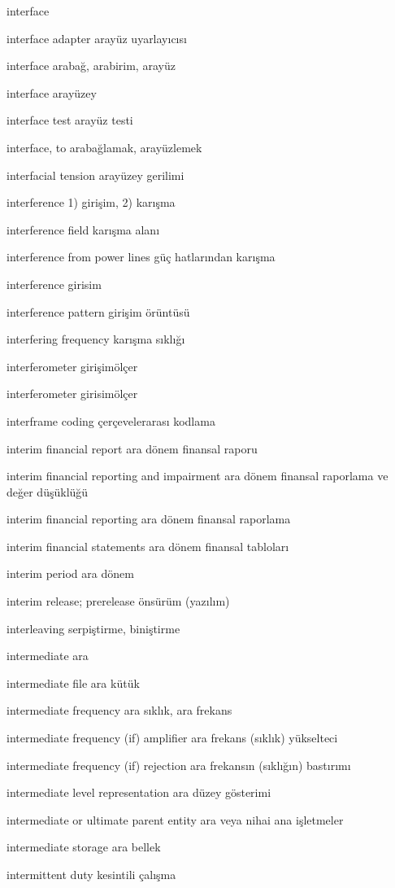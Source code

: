 \documentclass[12pt,fleqn]{article}\usepackage{../../common}
\begin{document}
interface

interface adapter arayüz uyarlayıcısı

interface arabağ, arabirim, arayüz

interface arayüzey

interface test arayüz testi

interface, to arabağlamak, arayüzlemek

interfacial tension arayüzey gerilimi

interference 1) girişim, 2) karışma

interference field karışma alanı

interference from power lines güç hatlarından karışma

interference girisim

interference pattern girişim örüntüsü

interfering frequency karışma sıklığı

interferometer girişimölçer

interferometer girisimölçer

interframe coding çerçevelerarası kodlama

interim financial report ara dönem finansal raporu

interim financial reporting and impairment ara dönem finansal raporlama ve değer düşüklüğü

interim financial reporting ara dönem finansal raporlama

interim financial statements ara dönem finansal tabloları

interim period ara dönem

interim release; prerelease önsürüm (yazılım)

interleaving serpiştirme, biniştirme

intermediate ara

intermediate file ara kütük

intermediate frequency ara sıklık, ara frekans

intermediate frequency (if) amplifier ara frekans (sıklık) yükselteci

intermediate frequency (if) rejection ara frekansın (sıklığın) bastırımı

intermediate level representation ara düzey gösterimi

intermediate or ultimate parent entity ara veya nihai ana işletmeler

intermediate storage ara bellek

intermittent duty kesintili çalışma
\end{document}
